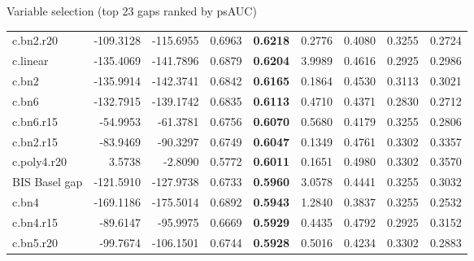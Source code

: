 \documentclass[
  ignorenonframetext,
]{beamer}
\begin{document}
\begin{frame}{Variable selection (top 23 gaps ranked by psAUC)}
{\begin{tabular}[t]{lrrr>{}rrrrr}
\addlinespace
c.bn2.r20 & -109.3128 & -115.6955 & 0.6963 & \textbf{0.6218} & 0.2776 & 0.4080 & 0.3255 & 0.2724\\
c.linear & -135.4069 & -141.7896 & 0.6879 & \textbf{0.6204} & 3.9989 & 0.4616 & 0.2925 & 0.2986\\
c.bn2 & -135.9914 & -142.3741 & 0.6842 & \textbf{0.6165} & 0.1864 & 0.4530 & 0.3113 & 0.3021\\
c.bn6 & -132.7915 & -139.1742 & 0.6835 & \textbf{0.6113} & 0.4710 & 0.4371 & 0.2830 & 0.2712\\
c.bn6.r15 & -54.9953 & -61.3781 & 0.6756 & \textbf{0.6070} & 0.5680 & 0.4179 & 0.3255 & 0.2806\\
\addlinespace
c.bn2.r15 & -83.9469 & -90.3297 & 0.6749 & \textbf{0.6047} & 0.1349 & 0.4761 & 0.3302 & 0.3357\\
c.poly4.r20 & 3.5738 & -2.8090 & 0.5772 & \textbf{0.6011} & 0.1651 & 0.4980 & 0.3302 & 0.3570\\
BIS Basel gap & -121.5910 & -127.9738 & 0.6733 & \textbf{0.5960} & 3.0578 & 0.4441 & 0.3255 & 0.3032\\
c.bn4 & -169.1186 & -175.5014 & 0.6892 & \textbf{0.5943} & 1.2840 & 0.3837 & 0.3255 & 0.2532\\
c.bn4.r15 & -89.6147 & -95.9975 & 0.6669 & \textbf{0.5929} & 0.4435 & 0.4792 & 0.2925 & 0.3152\\
\addlinespace
c.bn5.r20 & -99.7674 & -106.1501 & 0.6744 & \textbf{0.5928} & 0.5016 & 0.4234 & 0.3302 & 0.2883\\
\bottomrule
\end{tabular}}
\end{frame}
\end{document}
